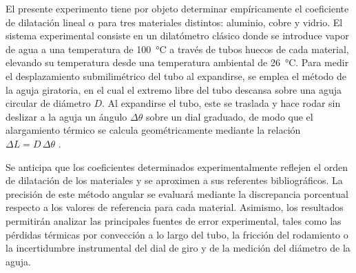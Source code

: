 El presente experimento tiene por objeto determinar empíricamente el coeficiente de dilatación lineal $\alpha$ para tres materiales distintos: aluminio, cobre y vidrio. El sistema experimental consiste en un dilatómetro clásico donde se introduce vapor de agua a una temperatura de \qty{100}{\celsius} a través de tubos huecos de cada material, elevando su temperatura desde una temperatura ambiental de \qty{26}{\celsius}. Para medir el desplazamiento submilimétrico del tubo al expandirse, se emplea el método de la aguja giratoria, en el cual el extremo libre del tubo descansa sobre una aguja circular de diámetro $D$. Al expandirse el tubo, este se traslada y hace rodar sin deslizar a la aguja un ángulo $\Delta\theta$ sobre un dial graduado, de modo que el alargamiento térmico se calcula geométricamente mediante la relación $\Delta L = D\,\Delta\theta$ \cite{halliday}.

Se anticipa que los coeficientes determinados experimentalmente reflejen el orden de dilatación de los materiales y se aproximen a sus referentes bibliográficos. La precisión de este método angular se evaluará mediante la discrepancia porcentual respecto a los valores de referencia para cada material. Asimismo, los resultados permitirán analizar las principales fuentes de error experimental, tales como las pérdidas térmicas por convección a lo largo del tubo, la fricción del rodamiento o la incertidumbre instrumental del dial de giro y de la medición del diámetro de la aguja.